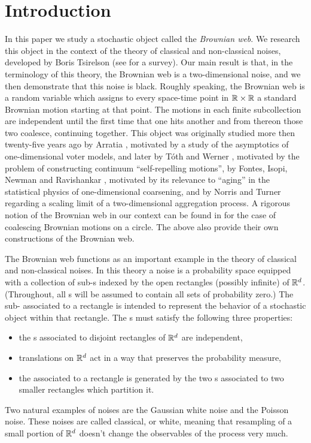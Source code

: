 {\section{Introduction}
In this paper we study a stochastic object called the \emph{Brownian web}. We
research this object in the context of the theory of classical and
non-classical noises, developed by Boris Tsirelson
(see \cite{tsirelson-nonclassical-stochastic-flows} for a survey).
Our main result
is that, in the terminology of this theory, the Brownian web is a
two-dimensional noise, and we then demonstrate that this noise is black.
Roughly speaking, the Brownian web is a random variable which assigns to
every space-time point in $\mathbb{R}\times\mathbb{R}$ a standard Brownian motion starting
at that point.  The motions in each finite subcollection are independent
until the first time that one hits another
and from thereon those two coalesce, continuing together. This object was
originally studied more then twenty-five years ago by Arratia \cite{arratia}, motivated
by a study of the asymptotics of one-dimensional voter models, and later
by T\'{o}th and Werner \cite{toth-werner},
motivated by the problem of constructing continuum
``self-repelling motions'', by Fontes, Isopi, Newman and Ravishankar
\cite{fontes-et-al},
motivated by its relevance to ``aging'' in the statistical physics of
one-dimensional coarsening, and by Norris and Turner
\cite{norris-turner}
regarding a scaling limit of a two-dimensional aggregation process.
A rigorous notion of the Brownian web in our context
can be found in \cite{tsirelson-lecture-course} for the case of coalescing
Brownian motions on a circle.  The above also provide
their own constructions of the Brownian web.

The Brownian web functions as an important example in the theory of
classical and non-classical noises. In this
theory a noise is a probability space equipped with a collection
of sub-\sigfield{}s indexed by the open rectangles (possibly infinite) of
$\mathbb{R}^d$.
(Throughout, all \sigfield{}s will be assumed to contain all sets of
probability zero.)
The sub-\sigfield{} associated to a rectangle is intended to
represent the behavior of a stochastic object within that rectangle.
The \sigfield{}s must satisfy the following three properties:
\begin{itemize}
\item the \sigfield{}s associated to disjoint rectangles of $\mathbb{R}^d$ are
independent,
\item translations on $\mathbb{R}^d$ act in a way that preserves the
probability measure,
\item the \sigfield{}
associated to a rectangle is generated by the two \sigfield{}s
associated to two smaller rectangles which partition it.
\end{itemize}
Two natural examples of noises are the Gaussian white noise
and the Poisson noise. These noises are called classical, or white,
meaning that
resampling of a small portion of $\mathbb{R}^d$ doesn't change the observables of the
process very much.

}

